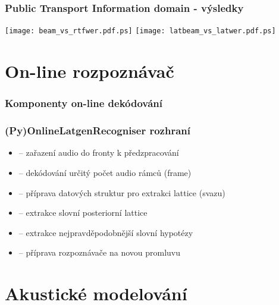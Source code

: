\begin{frame}\frametitle{Public Transport Information domain - výsledky} 
    \texttt{[image: beam\_vs\_rtfwer.pdf.ps]}
    \texttt{[image: latbeam\_vs\_latwer.pdf.ps]}
\end{frame}


\section{On-line rozpoznávač} %

\begin{frame}\frametitle{Komponenty on-line dekódování} 
    \begin{center}
        
    \end{center}
\end{frame}

\begin{frame}\frametitle{(Py)OnlineLatgenRecogniser rozhraní} 
    \begin{itemize}
        \item {} -- zařazení audio do fronty k předzpracování
        \item {} -- dekódování určitý počet audio rámců (frame)
        \item {} -- příprava datových struktur pro extrakci lattice (svazu)
        \item {} -- extrakce slovní posteriorní lattice
        \item {} -- extrakce nejpravděpodobnější slovní hypotézy
        \item {} -- příprava rozpoznávače na novou promluvu
    \end{itemize}
\end{frame}

\section{Akustické modelování} %

